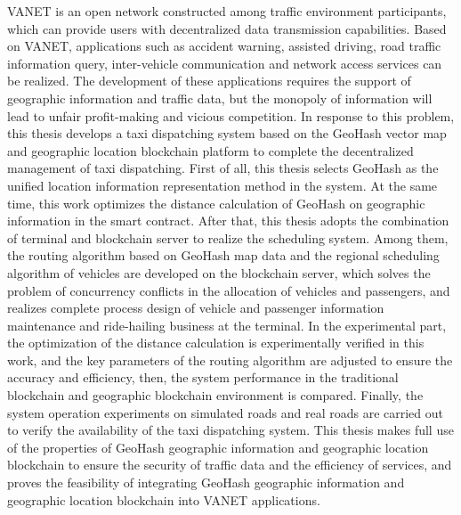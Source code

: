 \begin{englishabstract}

VANET is an open network constructed among traffic environment participants, which can provide users with decentralized data transmission capabilities. Based on VANET, applications such as accident warning, assisted driving, road traffic information query, inter-vehicle communication and network access services can be realized. The development of these applications requires the support of geographic information and traffic data, but the monopoly of information will lead to unfair profit-making and vicious competition. In response to this problem, this thesis develops a taxi dispatching system based on the GeoHash vector map and geographic location blockchain platform to complete the decentralized management of taxi dispatching. First of all, this thesis selects GeoHash as the unified location information representation method in the system. At the same time, this work optimizes the distance calculation of GeoHash on geographic information in the smart contract. After that, this thesis adopts the combination of terminal and blockchain server to realize the scheduling system. Among them, the routing algorithm based on GeoHash map data and the regional scheduling algorithm of vehicles are developed on the blockchain server, which solves the problem of concurrency conflicts in the allocation of vehicles and passengers, and realizes complete process design of vehicle and passenger information maintenance and ride-hailing business at the terminal. In the experimental part, the optimization of the distance calculation is experimentally verified in this work, and the key parameters of the routing algorithm are adjusted to ensure the accuracy and efficiency, then, the system performance in the traditional blockchain and geographic blockchain environment is compared. Finally, the system operation experiments on simulated roads and real roads are carried out to verify the availability of the taxi dispatching system. This thesis makes full use of the properties of GeoHash geographic information and geographic location blockchain to ensure the security of traffic data and the efficiency of services, and proves the feasibility of integrating GeoHash geographic information and geographic location blockchain into VANET applications.


\end{englishabstract}
